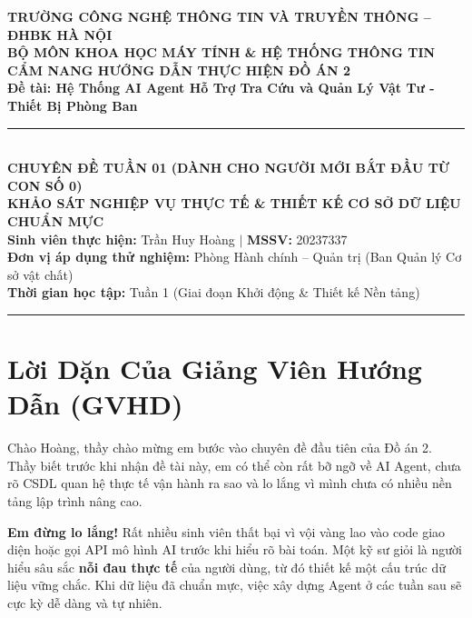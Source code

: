 \documentclass[11pt,a4paper]{article}
\begin{document}
\begin{center}
    {\large \textbf{TRƯỜNG CÔNG NGHỆ THÔNG TIN VÀ TRUYỀN THÔNG -- ĐHBK HÀ NỘI}}\\[0.2em]
    {\normalsize \textbf{BỘ MÔN KHOA HỌC MÁY TÍNH \& HỆ THỐNG THÔNG TIN}}\\[1.0em]
    
    {\Large \bfseries \color{blue!85!black} CẨM NANG HƯỚNG DẪN THỰC HIỆN ĐỒ ÁN 2}\\[0.3em]
    {\large \textbf{Đề tài: Hệ Thống AI Agent Hỗ Trợ Tra Cứu và Quản Lý Vật Tư - Thiết Bị Phòng Ban}}\\[0.8em]
    
    \rule{0.85\textwidth}{0.8pt}\\[0.6em]
    
    {\bfseries CHUYÊN ĐỀ TUẦN 01 (DÀNH CHO NGƯỜI MỚI BẮT ĐẦU TỪ CON SỐ 0)}\\[0.3em]
    {\large \bfseries KHẢO SÁT NGHIỆP VỤ THỰC TẾ \& THIẾT KẾ CƠ SỞ DỮ LIỆU CHUẨN MỰC}\\[0.8em]
    
    \small
    \textbf{Sinh viên thực hiện:} Trần Huy Hoàng \quad $\vert$ \quad \textbf{MSSV:} 20237337\\
    \textbf{Đơn vị áp dụng thử nghiệm:} Phòng Hành chính -- Quản trị (Ban Quản lý Cơ sở vật chất)\\
    \textbf{Thời gian học tập:} Tuần 1 (Giai đoạn Khởi động \& Thiết kế Nền tảng)
\end{center}

\vspace{0.2cm}
\hrule
\vspace{0.3cm}

\section{Lời Dặn Của Giảng Viên Hướng Dẫn (GVHD)}

Chào Hoàng, thầy chào mừng em bước vào chuyên đề đầu tiên của Đồ án 2. Thầy biết trước khi nhận đề tài này, em có thể còn rất bỡ ngỡ về AI Agent, chưa rõ CSDL quan hệ thực tế vận hành ra sao và lo lắng vì mình chưa có nhiều nền tảng lập trình nâng cao.

\textbf{Em đừng lo lắng!} Rất nhiều sinh viên thất bại vì vội vàng lao vào code giao diện hoặc gọi API mô hình AI trước khi hiểu rõ bài toán. Một kỹ sư giỏi là người hiểu sâu sắc \textbf{nỗi đau thực tế} của người dùng, từ đó thiết kế một cấu trúc dữ liệu vững chắc. Khi dữ liệu đã chuẩn mực, việc xây dựng Agent ở các tuần sau sẽ cực kỳ dễ dàng và tự nhiên.
\end{document}
